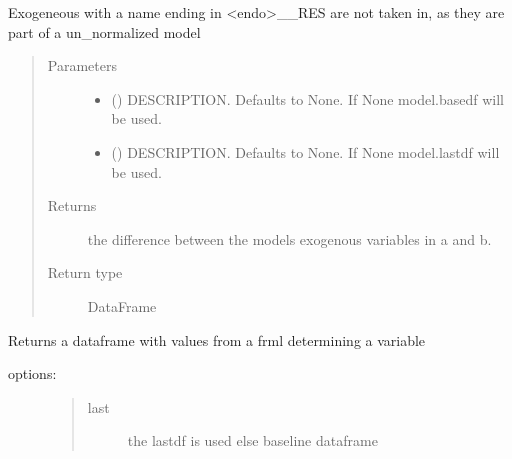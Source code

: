 \documentclass[letterpaper,10pt,english]{sphinxmanual}
\begin{document}
\begin{fulllineitems}
\begin{fulllineitems}
\sphinxAtStartPar
Exogeneous with a name ending in \textless{}endo\textgreater{}\_\_RES are not taken in, as they are part of a un\_normalized model
\begin{quote}\begin{description}
\item[{Parameters}] \leavevmode\begin{itemize}
\item {} 
\sphinxAtStartPar
{} (\sphinxstyleliteralemphasis{\sphinxupquote{, }}) \textendash{} DESCRIPTION. Defaults to None. If None model.basedf will be used.

\item {} 
\sphinxAtStartPar
{} (\sphinxstyleliteralemphasis{\sphinxupquote{, }}) \textendash{} DESCRIPTION. Defaults to None. If None model.lastdf will be used.

\end{itemize}

\item[{Returns}] \leavevmode
\sphinxAtStartPar
the difference between the models exogenous variables in a and b.

\item[{Return type}] \leavevmode
\sphinxAtStartPar
DataFrame

\end{description}\end{quote}

\end{fulllineitems}


\begin{fulllineitems}
\label{\detokenize{index:modelclass.Org_model_Mixin.get_eq_values}}
\pysigstartsignatures
{}
\pysigstopsignatures
\sphinxAtStartPar
Returns a dataframe with values from a frml determining a variable
\begin{description}
\item[{options:}] \leavevmode\begin{quote}\begin{description}
\item[{last}] \leavevmode
\sphinxAtStartPar
the lastdf is used else baseline dataframe


\end{description}
\end{quote}
\end{description}
\end{fulllineitems}
\end{fulllineitems}
\end{document}
